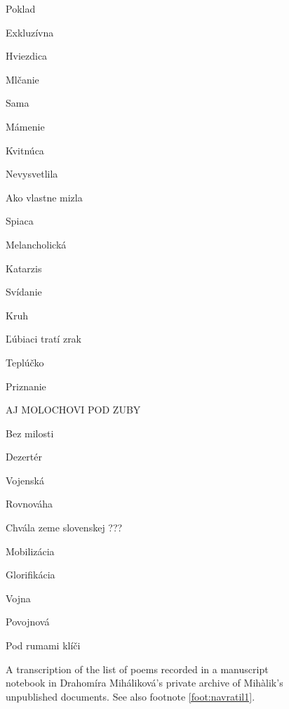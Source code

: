 \begin{paper}
\begin{figure}
\begin{multicols}{2}
Poklad

Exkluzívna 

Hviezdica

Mlčanie

Sama

Mámenie

Kvitnúca

Nevysvetlila 

Ako vlastne mizla

Spiaca

Melancholická

Katarzis

Svídanie 

Kruh

Ľúbiaci tratí zrak

Teplúčko 

Priznanie

\vspace{1em} 

\begin{center}AJ MOLOCHOVI POD ZUBY\end{center}

Bez milosti

Dezertér

Vojenská

Rovnováha

Chvála zeme slovenskej ???

Mobilizácia

Glorifikácia 

Vojna

Povojnová

Pod rumami klíči

\end{multicols}
      \caption{A transcription of the list of poems recorded in a manuscript notebook in Drahomíra Miháliková's private archive of Mihàlik's unpublished documents. See also footnote \ref{foot:navratil1}.}
    \label{fig:navratil1}
\end{figure}


\end{paper}

